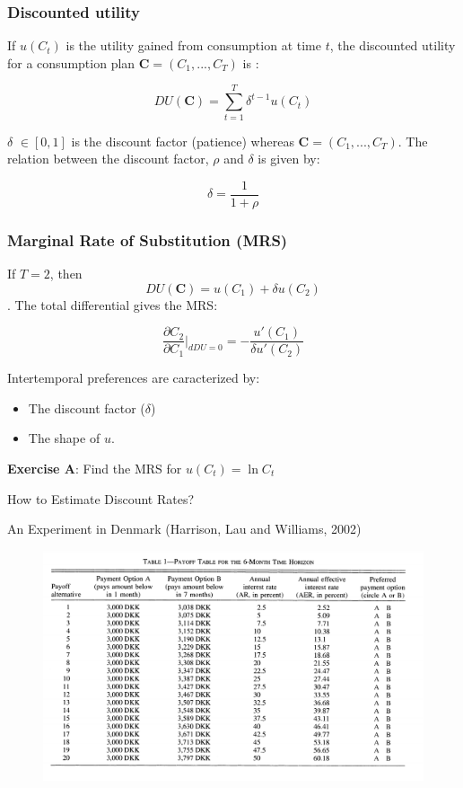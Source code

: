 \documentclass[handout]{beamer}
\begin{document}
\begin{frame}\frametitle{Discounted utility}

If $u(C_t)$ is the utility gained from consumption at time $t$, the discounted utility for a consumption plan $\textbf{C} = (C_1,...,C_T)$ is :


$$ DU(\mathbf{C}) = \sum_{t=1}^T \delta^{t-1} u(C_t) $$

$\delta$ $\in [0,1]$ is the discount factor (patience) whereas $\mathbf{C} = (C_1,...,C_T)$. The relation between the discount factor, $\rho$ and $\delta$ is given by: 

$$ \delta = \frac{1}{1+\rho} $$

\end{frame}

\begin{frame}\frametitle{Marginal Rate of Substitution (MRS)}

If $T=2$, then $$ DU(\textbf{C}) = u(C_1) +  \delta u(C_2) $$. The total differential gives the MRS: 

$$ \frac{\partial C_2}{\partial C_1}\rvert_{dDU=0} = -\frac{u'(C_1)}{\delta u'(C_2)}$$

Intertemporal preferences are caracterized by: 

\begin{itemize}
\item The discount factor ($\delta$)
\item The shape of $u$. 
\end{itemize}

\textbf{Exercise A}: Find the MRS for $u(C_t) = \ln C_t$

\end{frame}


\begin{frame}{How to Estimate Discount Rates?}

An Experiment in Denmark  (Harrison, Lau and Williams, 2002)

\begin{figure}
\includegraphics[scale=0.5]{MPL.png}
\end{figure}


\end{frame}
\end{document}
